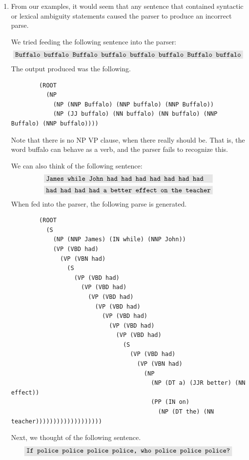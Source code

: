 \documentclass[11pt]{article}
\newcommand{\codebox}[1]{\colorbox{codegray}{\texttt{#1}}}
\begin{document}
\begin{enumerate}
\begin{enumerate}[label=(\alph*)]
	\item

		From our examples, it would seem that any sentence that contained syntactic or lexical ambiguity statements caused the parser to produce an incorrect parse.

		We tried feeding the following sentence into the parser:
		\begin{eqnarray*}
		\codebox{Buffalo buffalo Buffalo buffalo buffalo buffalo Buffalo buffalo}
		\end{eqnarray*}
		The output produced was the following.
		\begin{lstlisting}
		(ROOT
		  (NP
		    (NP (NNP Buffalo) (NNP buffalo) (NNP Buffalo))
		    (NP (JJ buffalo) (NN buffalo) (NN buffalo) (NNP Buffalo) (NNP buffalo))))
    	\end{lstlisting}
    	Note that there is no NP VP clause, when there really should be. That is, the word buffalo can behave as a verb, and the parser fails to recognize this.

\newpage

    	We can also think of the following sentence:
    	\begin{eqnarray*}
    	\codebox{James while John had had had had had had had \ } \\
    	\codebox{had had had had a better effect on the teacher}
    	\end{eqnarray*}
    	When fed into the parser, the following parse is generated.
    	\begin{lstlisting}
		(ROOT
		  (S
		    (NP (NNP James) (IN while) (NNP John))
		    (VP (VBD had)
		      (VP (VBN had)
		        (S
		          (VP (VBD had)
		            (VP (VBD had)
		              (VP (VBD had)
		                (VP (VBD had)
		                  (VP (VBD had)
		                    (VP (VBD had)
		                      (VP (VBD had)
		                        (S
		                          (VP (VBD had)
		                            (VP (VBN had)
		                              (NP
		                                (NP (DT a) (JJR better) (NN effect))
		                                (PP (IN on)
		                                  (NP (DT the) (NN teacher)))))))))))))))))))
    	\end{lstlisting}

		Next, we thought of the following sentence.
    	\begin{eqnarray*}
    		\codebox{If police police police police, who police police police?}
    	\end{eqnarray*}


\end{enumerate}
\end{enumerate}
\end{document}

